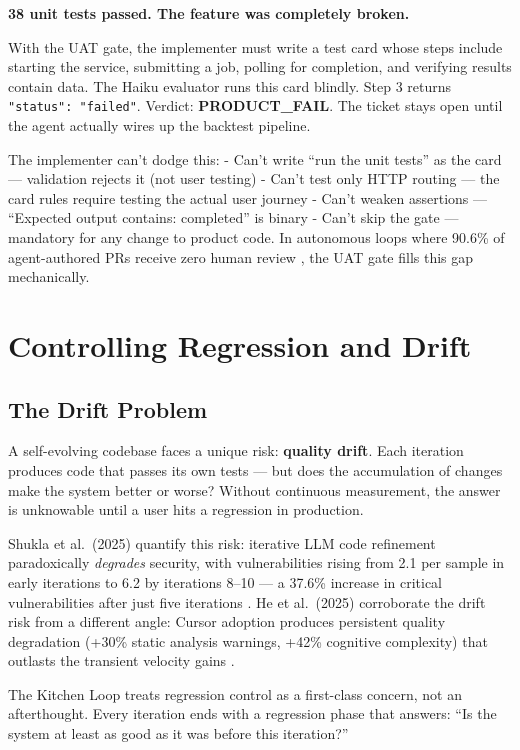 \documentclass[11pt,a4paper]{article}
\begin{document}
\textbf{38 unit tests passed. The feature was completely broken.}

With the UAT gate, the implementer must write a test card whose steps include starting the service, submitting a job, polling for completion, and verifying results contain data. The Haiku evaluator runs this card blindly. Step 3 returns \texttt{"status":\ "failed"}. Verdict: \textbf{PRODUCT\_FAIL}. The ticket stays open until the agent actually wires up the backtest pipeline.

The implementer can't dodge this: - Can't write ``run the unit tests'' as the card --- validation rejects it (not user testing) - Can't test only HTTP routing --- the card rules require testing the actual user journey - Can't weaken assertions --- ``Expected output contains: completed'' is binary - Can't skip the gate --- mandatory for any change to product code. In autonomous loops where 90.6\% of agent-authored PRs receive zero human review \cite{rahman2026}, the UAT gate fills this gap mechanically.


\section{Controlling Regression and Drift}\label{sec:controlling-regression-and-drift}

\subsection{The Drift Problem}\label{sec:drift-problem}

A self-evolving codebase faces a unique risk: \textbf{quality drift}. Each iteration produces code that passes its own tests --- but does the accumulation of changes make the system better or worse? Without continuous measurement, the answer is unknowable until a user hits a regression in production.

Shukla et al.~(2025) quantify this risk: iterative LLM code refinement paradoxically \emph{degrades} security, with vulnerabilities rising from 2.1 per sample in early iterations to 6.2 by iterations 8--10 --- a 37.6\% increase in critical vulnerabilities after just five iterations \cite{shukla2025}. He et al.~(2025) corroborate the drift risk from a different angle: Cursor adoption produces persistent quality degradation (+30\% static analysis warnings, +42\% cognitive complexity) that outlasts the transient velocity gains \cite{he2025}.

The Kitchen Loop treats regression control as a first-class concern, not an afterthought. Every iteration ends with a regression phase that answers: ``Is the system at least as good as it was before this iteration?''
\end{document}
